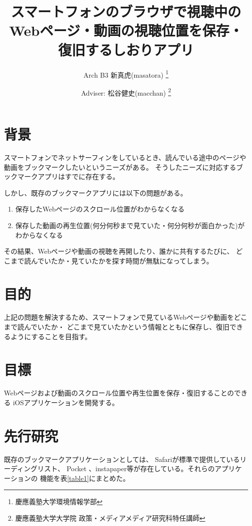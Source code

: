 \documentclass[a4j,10pt]{jsarticle}
\begin{document}

\title{スマートフォンのブラウザで視聴中のWebページ・動画の視聴位置を保存・復旧するしおりアプリ}

\author{
    Arch B3 新真虎(masatora) \thanks{慶應義塾大学環境情報学部}
    \and
    Adviser: 松谷健史(macchan) \thanks{慶應義塾大学大学院 政策・メディアメディア研究科特任講師}
}

\maketitle
\thispagestyle{empty}

\section{背景}
スマートフォンでネットサーフィンをしているとき、読んでいる途中のページや動画をブックマークしたいというニーズがある。
そうしたニーズに対応するブックマークアプリはすでに存在する\cite{Pocket}\cite{instapaper}。

しかし、既存のブックマークアプリには以下の問題がある。
\begin{enumerate}
\item 保存したWebページのスクロール位置がわからなくなる
\item 保存した動画の再生位置(何分何秒まで見ていた・何分何秒が面白かった)がわからなくなる
\end{enumerate}

その結果、Webページや動画の視聴を再開したり、誰かに共有するたびに、
どこまで読んでいたか・見ていたかを探す時間が無駄になってしまう。


\section{目的}
上記の問題を解決するため、スマートフォンで見ているWebページや動画をどこまで読んでいたか・
どこまで見ていたかという情報とともに保存し、復旧できるようにすることを目指す。

\section{目標}
Webページおよび動画のスクロール位置や再生位置を保存・復旧することのできる
iOSアプリケーションを開発する\cite{shiori-web-for-safari}。

\section{先行研究}
既存のブックマークアプリケーションとしては、
Safariが標準で提供しているリーディングリスト、
Pocket\cite{Pocket} 、instapaper\cite{instapaper}等が存在している。それらのアプリケーションの
機能を表\ref{table1}にまとめた。
\end{document}
